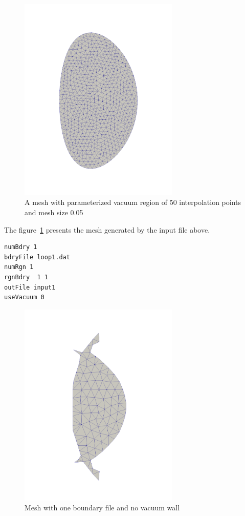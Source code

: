 \begin{figure}
\centering
\includegraphics[width=3in]{./figures/meshgen-analytic-50pts-05.pdf}
\caption[Mesh with parameterized vacuum region II]
{A mesh with parameterized vacuum region of 50 interpolation points and mesh size 0.05}
\label{fig:analytic-mesh-2}
\end{figure}

The figure~\ref{fig:analytic-mesh-2} presents the mesh generated by the input file above.

\begin{verbatim}
numBdry 1
bdryFile loop1.dat
numRgn 1
rgnBdry  1 1
outFile input1
useVacuum 0
\end{verbatim}

\begin{figure}
\centering
\includegraphics[width=3in]{./figures/meshgen-input1-novacuum.pdf}
\caption[Mesh with one boundary file and no vacuum wall]{Mesh with one boundary file and no vacuum wall}
\label{fig:input1}
\end{figure}

